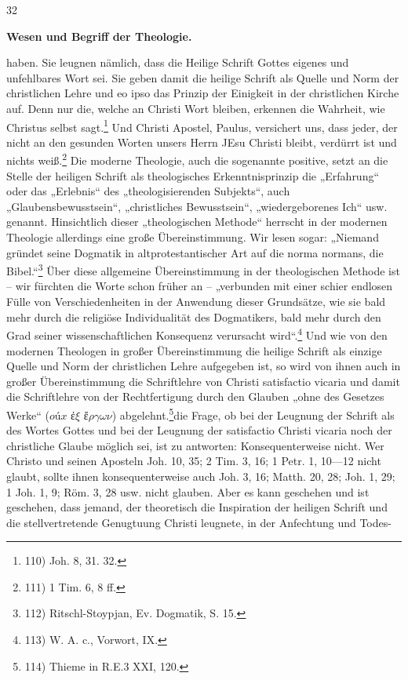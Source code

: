 \begin{flushright}32\end{flushright}\n\n\begin{center}\textbf{Wesen und Begriff der Theologie.}\end{center}\n\naufgegeben haben. Sie leugnen nämlich, dass die Heilige Schrift Gottes eigenes und unfehlbares Wort sei. Sie geben damit die heilige Schrift als Quelle und Norm der christlichen Lehre und eo ipso das Prinzip der Einigkeit in der christlichen Kirche auf. Denn nur die, welche an Christi Wort bleiben, erkennen die Wahrheit, wie Christus selbst sagt.\footnote{110) Joh. 8, 31. 32.} Und Christi Apostel, Paulus, versichert uns, dass jeder, der nicht an den gesunden Worten unsers Herrn JEsu Christi bleibt, verdürrt ist und nichts weiß.\footnote{111) 1 Tim. 6, 8 ff.} Die moderne Theologie, auch die sogenannte positive, setzt an die Stelle der heiligen Schrift als theologisches Erkenntnisprinzip die „Erfahrung“ oder das „Erlebnis“ des „theologisierenden Subjekts“, auch „Glaubensbewusstsein“, „christliches Bewusstsein“, „wiedergeborenes Ich“ usw. genannt. Hinsichtlich dieser „theologischen Methode“ herrscht in der modernen Theologie allerdings eine große Übereinstimmung. Wir lesen sogar: „Niemand gründet seine Dogmatik in altprotestantischer Art auf die norma normans, die Bibel.“\footnote{112) Ritschl-Stoypjan, Ev. Dogmatik, S. 15.} Über diese allgemeine Übereinstimmung in der theologischen Methode ist – wir fürchten die Worte schon früher an – „verbunden mit einer schier endlosen Fülle von Verschiedenheiten in der Anwendung dieser Grundsätze, wie sie bald mehr durch die religiöse Individualität des Dogmatikers, bald mehr durch den Grad seiner wissenschaftlichen Konsequenz verursacht wird“.\footnote{113) W. A. c., Vorwort, IX.} Und wie von den modernen Theologen in großer Übereinstimmung die heilige Schrift als einzige Quelle und Norm der christlichen Lehre aufgegeben ist, so wird von ihnen auch in großer Übereinstimmung die Schriftlehre von Christi satisfactio vicaria und damit die Schriftlehre von der Rechtfertigung durch den Glauben „ohne des Gesetzes Werke“ ($\textit{oúx ἐξ ἔργων}$) abgelehnt.\footnote{114) Thieme in R.E.3 XXI, 120.}\n\nAuf die Frage, ob bei der Leugnung der Schrift als des Wortes Gottes und bei der Leugnung der satisfactio Christi vicaria noch der christliche Glaube möglich sei, ist zu antworten: Konsequenterweise nicht. Wer Christo und seinen Aposteln Joh. 10, 35; 2 Tim. 3, 16; 1 Petr. 1, 10—12 nicht glaubt, sollte ihnen konsequenterweise auch Joh. 3, 16; Matth. 20, 28; Joh. 1, 29; 1 Joh. 1, 9; Röm. 3, 28 usw. nicht glauben. Aber es kann geschehen und ist geschehen, dass jemand, der theoretisch die Inspiration der heiligen Schrift und die stellvertretende Genugtuung Christi leugnete, in der Anfechtung und Todes-